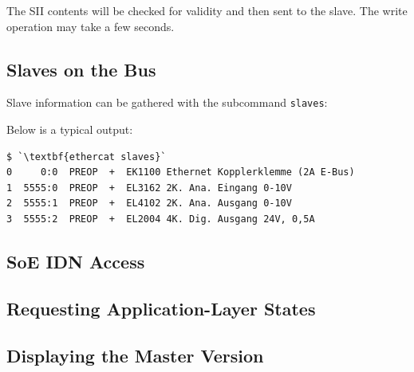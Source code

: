 \documentclass[a4paper,12pt,BCOR6mm,bibtotoc,idxtotoc]{scrbook}
\begin{document}
The SII contents will be checked for validity and then sent to the slave. The
write operation may take a few seconds.


\subsection{Slaves on the Bus}

Slave information can be gathered with the subcommand \lstinline+slaves+:



Below is a typical output:

\begin{lstlisting}
$ `\textbf{ethercat slaves}`
0     0:0  PREOP  +  EK1100 Ethernet Kopplerklemme (2A E-Bus)
1  5555:0  PREOP  +  EL3162 2K. Ana. Eingang 0-10V
2  5555:1  PREOP  +  EL4102 2K. Ana. Ausgang 0-10V
3  5555:2  PREOP  +  EL2004 4K. Dig. Ausgang 24V, 0,5A
\end{lstlisting}


\subsection{SoE IDN Access}
\label{sec:soeaccess}






\subsection{Requesting Application-Layer States}




\subsection{Displaying the Master Version}
\end{document}
